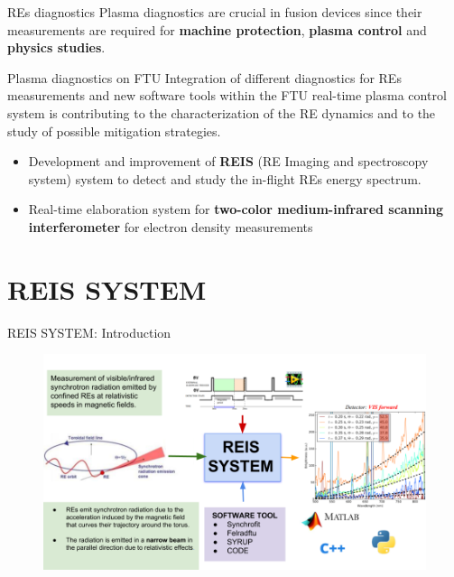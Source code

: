 \documentclass{beamer}
\begin{document}
\begin{frame}{REs diagnostics}
    \scriptsize
    Plasma diagnostics are crucial in fusion devices since their measurements are required for \textbf{machine protection}, \textbf{plasma control} and \textbf{physics studies}.
    \begin{block}{Plasma diagnostics on FTU}
     \scriptsize	
     Integration of different diagnostics for REs measurements and new software tools within the FTU real-time plasma control system is contributing to the characterization of the RE dynamics and to the study of possible mitigation strategies.
    	\scriptsize
    	\begin{itemize}
    		\item Development and improvement of \textbf{REIS} (RE  Imaging  and  spectroscopy system) system  to detect and study the in-flight REs energy spectrum.
    		\item Real-time elaboration system for \textbf{two-color medium-infrared scanning interferometer} for electron density measurements
    	\end{itemize}
    \end{block}
\end{frame}





\section{REIS SYSTEM}
\begin{frame}[allowframebreaks]{REIS SYSTEM: Introduction}

\begin{figure}
\centering
\includegraphics[width=1\textwidth]{drive/REISintro.png}
\end{figure} 


\end{frame}
\end{document}

